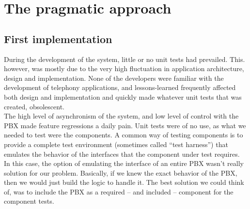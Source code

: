 \chapter{The pragmatic approach}
\section{First implementation}
During the development of the system, little or no unit tests had prevailed. This. however, was mostly due to the very high fluctuation in application architecture, design and implementation. None of the developers were familiar with the development of telephony applications, and lessons-learned frequently affected both design and implementation and quickly made whatever unit tests that was created, obsolescent.\\
The high level of asynchronism of the system, and low level of control with the PBX made feature regressions a daily pain. Unit tests were of no use, as what we needed to test were the components. A common way of testing components is to provide a complete test environment (sometimes called ``test harness'') that emulates the behavior of the interfaces that the component under test requires. In this case, the option of emulating the interface of an entire PBX wasn't really solution for our problem. Basically, if we knew the exact behavior of the PBX, then we would just build the logic to handle it. The best solution we could think of, was to include the PBX as a required -- and included -- component for the component tests.

